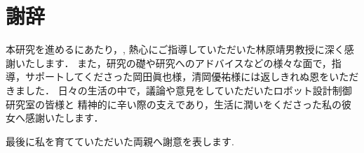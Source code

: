 \chapter*{謝辞}

本研究を進めるにあたり，, 熱心にご指導していただいた林原靖男教授に深く感謝いたします．
また，研究の礎や研究へのアドバイスなどの様々な面で，指導，サポートしてくださった岡田眞也様，清岡優祐様には返しきれぬ恩をいただきました．
日々の生活の中で，議論や意見をしていただいたロボット設計制御研究室の皆様と
精神的に辛い際の支えであり，生活に潤いをくださった私の彼女へ感謝いたします．

最後に私を育てていただいた両親へ謝意を表します.
